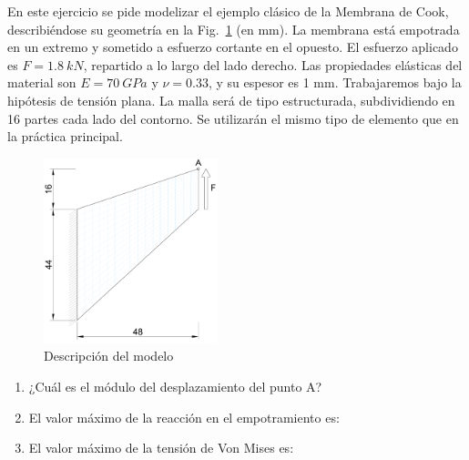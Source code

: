 \documentclass[a4paper,12pt]{article}
\begin{document}
En este ejercicio se pide modelizar el ejemplo clásico de la Membrana de Cook, describiéndose su geometría en la Fig.~\ref{figu120} (en mm). La membrana está empotrada en un extremo y sometido a esfuerzo cortante en el opuesto. El esfuerzo aplicado es $F=1.8\ kN$, repartido a lo largo del lado derecho. Las propiedades elásticas del material son $E=70\ GPa$ y $\nu=0.33$, y su espesor es 1 mm. Trabajaremos bajo la hipótesis de tensión plana.
La malla será de tipo estructurada, subdividiendo en 16 partes cada lado del contorno. Se utilizarán el mismo tipo de elemento que en la práctica principal. 
\begin{figure}[!h]
  \begin{center}
    \includegraphics[width=0.45\textwidth]{./figs/membrana1}
  \end{center}
  \caption{Descripción del modelo}
  \label{figu120}
\end{figure}
\begin{enumerate}
\item ¿Cuál es el módulo del desplazamiento del punto A?
  \begin{multicols}{4}
\columnbreak
{}
\columnbreak
{}
\columnbreak
{}
  \end{multicols}
\item El valor máximo de la reacción en el empotramiento es:
  \begin{multicols}{4}
\columnbreak
{} %
\columnbreak
{}
\columnbreak
{}
  \end{multicols}
\item El valor máximo de la tensión de Von Mises es:
  \begin{multicols}{4}
\columnbreak
{} %
\columnbreak
{}
\columnbreak
{}
\end{multicols}
\end{enumerate}
\end{document}
